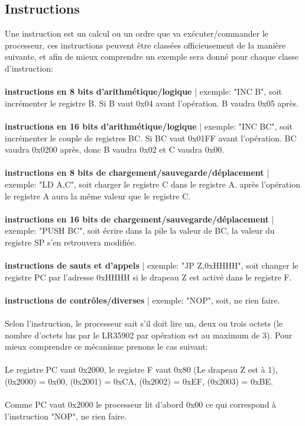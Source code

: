 \documentclass{report}
\begin{document}
\subsection{Instructions}
Une instruction est un calcul ou un ordre que va exécuter/commander le processeur, ces instructions peuvent être classées officieusement de la manière suivante, et afin de mieux comprendre un exemple sera donné pour chaque classe d'instruction:\\\\
\textbf{instructions en 8 bits d'arithmétique/logique} | exemple: "INC B", soit incrémenter le registre B. Si B vaut 0x04 avant l'opération. B vaudra 0x05 après.\\\\
\textbf{instructions en 16 bits d'arithmétique/logique} | exemple: "INC BC", soit incrémenter le couple de registres BC. Si BC vaut 0x01FF avant l'opération. BC vaudra 0x0200 après, donc B vaudra 0x02 et C vaudra 0x00.\\\\
\textbf{instructions en 8 bits de chargement/sauvegarde/déplacement} | exemple: "LD A,C", soit charger le registre C dans le registre A. après l'opération le registre A aura la même valeur que le registre C.\\\\
\textbf{instructions en 16 bits de chargement/sauvegarde/déplacement} | exemple: "PUSH BC", soit écrire dans la pile la valeur de BC, la valeur du registre SP s'en retrouvera modifiée.\\\\
\textbf{instructions de sauts et d'appels} | exemple: "JP Z,0xHHHH", soit changer le registre PC par l'adresse 0xHHHH si le drapeau Z est activé dans le registre F.\\\\
\textbf{instructions de contrôles/diverses} | exemple: "NOP", soit, ne rien faire.\\\\
Selon l'instruction, le processeur sait s'il doit lire un, deux ou trois octets (le nombre d'octets lus par le LR35902 par opération est au maximum de 3). Pour mieux comprendre ce mécanisme prenons le cas suivant:\\\\
Le registre PC vaut 0x2000, le registre F vaut 0x80 (Le drapeau Z est à 1), (0x2000) = 0x00, (0x2001) = 0xCA, (0x2002) = 0xEF, (0x2003) = 0xBE.\\\\
Comme PC vaut 0x2000 le processeur lit d'abord 0x00 ce qui correspond à l'instruction "NOP", ne rien faire. 
\end{document}
